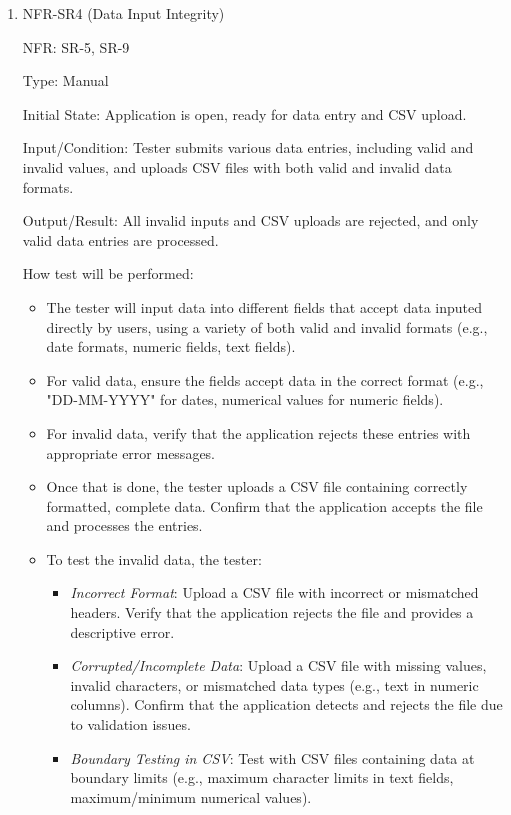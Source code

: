 \documentclass[12pt, titlepage]{article}
\begin{document}
\begin{enumerate}
\item{NFR-SR4 (Data Input Integrity)\\}
  
  NFR: SR-5, SR-9
  
  Type: Manual
  
  Initial State: Application is open, ready for data entry and CSV upload.
  
  Input/Condition: Tester submits various data entries, including valid and
  invalid values, and uploads CSV files with both valid and invalid data
  formats.
  
  Output/Result: All invalid inputs and CSV uploads are rejected, and only valid
  data entries are processed.

  How test will be performed: 
  \begin{itemize}
    \item The tester will input data into different fields that accept data
    inputed directly by users, using a variety of both valid and invalid formats
    (e.g., date formats, numeric fields, text fields).
    \item For valid data, ensure the fields accept data in the correct format
    (e.g., "DD-MM-YYYY" for dates, numerical values for numeric fields).
    \item For invalid data, verify that the application rejects these entries
    with appropriate error messages.
    \item Once that is done, the tester uploads a CSV file containing correctly
    formatted, complete data. Confirm that the application accepts the file and
    processes the entries.
    \item To test the invalid data, the tester:
    \begin{itemize}
      \item \emph{Incorrect Format}: Upload a CSV file with incorrect or
      mismatched headers. Verify that the application rejects the file and
      provides a descriptive error.
      \item \emph{Corrupted/Incomplete Data}: Upload a CSV file with missing
      values, invalid characters, or mismatched data types (e.g., text in
      numeric columns). Confirm that the application detects and rejects the
      file due to validation issues.
      \item \emph{Boundary Testing in CSV}: Test with CSV files containing data
      at boundary limits (e.g., maximum character limits in text fields,
      maximum/minimum numerical values).
    \end{itemize}
  \end{itemize}


\end{enumerate}
\end{document}
